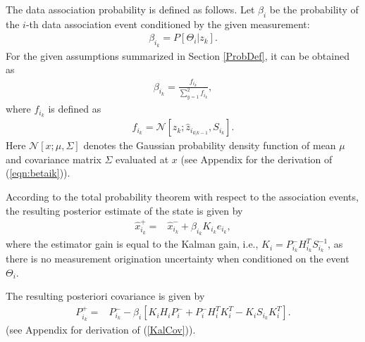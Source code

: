 \documentclass[letterpaper, 10pt, conference]{ieeeconf}
\newcommand{\refeqn}[1]{(\ref{eqn:#1})}
\begin{document}
The data association probability is defined as follows. Let $\beta_i$ be the probability of the $i$-th data association event conditioned by the given measurement:
\begin{align*}
\beta_{i_k} = P[\Theta_i|z_k].
\end{align*}
For the given assumptions summarized in Section \ref{ProbDef}, it can be obtained as
\begin{align}
\beta_{i_k}=\frac{f_{i_k}}{\sum\limits_{y=1}^2 f_{i_k}},\label{eqn:betaik}
\end{align}
where $f_{i_k}$ is defined as
\begin{align}
f_{i_k}=\mathcal{N}[z_{k};\hat z_{i_{k|k-1}},S_{i_k}].
\end{align}
Here $\mathcal{N}[x;\mu,\Sigma]$ denotes the Gaussian probability density function of mean $\mu$ and covariance matrix $\Sigma$ evaluated at $x$ (see Appendix for the derivation of \refeqn{betaik}).

According to the total probability theorem with respect to the association events, the resulting posterior estimate of the state is given by
\begin{align}
\hat x^+_{i_k}=&\hat x^-_{i_k}+\beta_{i_k}K_{i_k}e_{i_k}\label{KalEst},
\end{align}
where the estimator gain is equal to the Kalman gain, i.e., $K_i = P_{i_k}^{-} H_{i_k}^T S_{i_k}^{-1}$, as there is no measurement origination uncertainty when conditioned on the event $\Theta_i$. 

The resulting posteriori covariance is given by
\begin{align}
\label{KalCov}
P^+_{i_k}=&P^-_{i_k}-\beta_i[K_iH_iP_i^-+P_i^-H_i^TK_i^T-K_iS_{i_k}K_i^T].
\end{align}
(see Appendix for derivation of (\ref{KalCov})).
\end{document}
